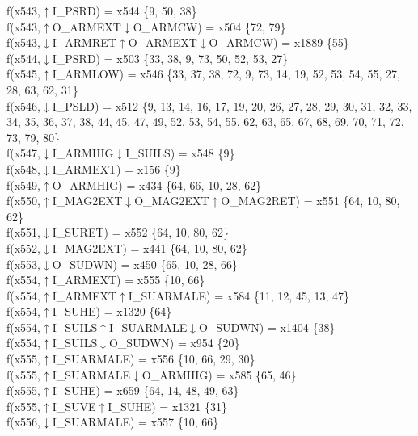 f(x543,$\uparrow$I\_PSRD) = x544 \{9, 50, 38\} \\  
f(x543,$\uparrow$O\_ARMEXT$\downarrow$O\_ARMCW) = x504 \{72, 79\} \\  
f(x543,$\downarrow$I\_ARMRET$\uparrow$O\_ARMEXT$\downarrow$O\_ARMCW) = x1889 \{55\} \\  
f(x544,$\downarrow$I\_PSRD) = x503 \{33, 38, 9, 73, 50, 52, 53, 27\} \\  
f(x545,$\uparrow$I\_ARMLOW) = x546 \{33, 37, 38, 72, 9, 73, 14, 19, 52, 53, 54, 55, 27, 28, 63, 62, 31\} \\  
f(x546,$\downarrow$I\_PSLD) = x512 \{9, 13, 14, 16, 17, 19, 20, 26, 27, 28, 29, 30, 31, 32, 33, 34, 35, 36, 37, 38, 44, 45, 47, 49, 52, 53, 54, 55, 62, 63, 65, 67, 68, 69, 70, 71, 72, 73, 79, 80\} \\  
f(x547,$\downarrow$I\_ARMHIG$\downarrow$I\_SUILS) = x548 \{9\} \\  
f(x548,$\downarrow$I\_ARMEXT) = x156 \{9\} \\  
f(x549,$\uparrow$O\_ARMHIG) = x434 \{64, 66, 10, 28, 62\} \\  
f(x550,$\uparrow$I\_MAG2EXT$\downarrow$O\_MAG2EXT$\uparrow$O\_MAG2RET) = x551 \{64, 10, 80, 62\} \\  
f(x551,$\downarrow$I\_SURET) = x552 \{64, 10, 80, 62\} \\  
f(x552,$\downarrow$I\_MAG2EXT) = x441 \{64, 10, 80, 62\} \\  
f(x553,$\downarrow$O\_SUDWN) = x450 \{65, 10, 28, 66\} \\  
f(x554,$\uparrow$I\_ARMEXT) = x555 \{10, 66\} \\  
f(x554,$\uparrow$I\_ARMEXT$\uparrow$I\_SUARMALE) = x584 \{11, 12, 45, 13, 47\} \\  
f(x554,$\uparrow$I\_SUHE) = x1320 \{64\} \\  
f(x554,$\uparrow$I\_SUILS$\uparrow$I\_SUARMALE$\downarrow$O\_SUDWN) = x1404 \{38\} \\  
f(x554,$\uparrow$I\_SUILS$\downarrow$O\_SUDWN) = x954 \{20\} \\  
f(x555,$\uparrow$I\_SUARMALE) = x556 \{10, 66, 29, 30\} \\  
f(x555,$\uparrow$I\_SUARMALE$\downarrow$O\_ARMHIG) = x585 \{65, 46\} \\  
f(x555,$\uparrow$I\_SUHE) = x659 \{64, 14, 48, 49, 63\} \\  
f(x555,$\uparrow$I\_SUVE$\uparrow$I\_SUHE) = x1321 \{31\} \\  
f(x556,$\downarrow$I\_SUARMALE) = x557 \{10, 66\} \\  
